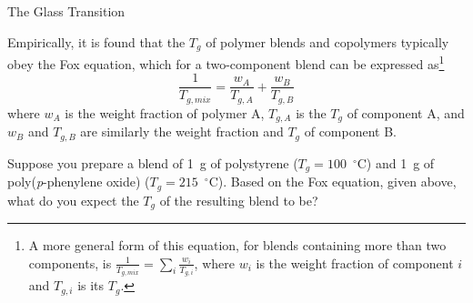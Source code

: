 \begin{activity}{The Glass Transition}
\begin{exercises}
	
		
	
	
	\exercise Empirically, it is found that the $T_g$ of polymer blends and copolymers typically obey the Fox equation, which for a two-component blend can be expressed as\footnote{A more general form of this equation, for blends containing more than two components, is $\frac{1}{T_{g,mix}} = \sum_i \frac{w_i}{T_{g,i}}$, where $w_i$ is the weight fraction of component $i$ and $T_{g,i}$ is its $T_g$.}
		\begin{equation*}
			\frac{1}{T_{g,mix}} = \frac{w_A}{T_{g,A}} + \frac{w_B}{T_{g,B}}
		\end{equation*}
		where $w_A$ is the weight fraction of polymer A, $T_{g,A}$ is the $T_g$ of component A, and $w_B$ and $T_{g,B}$ are similarly the weight fraction and $T_g$ of component B.
		
		Suppose you prepare a blend of 1~g of polystyrene ($T_g = 100$~$^\circ$C) and 1~g of poly(\emph{p}-phenylene oxide) ($T_g = 215$~$^\circ$C).  Based on the Fox equation, given above, what do you expect the $T_g$ of the resulting blend to be?
		

\end{exercises}
\end{activity}
